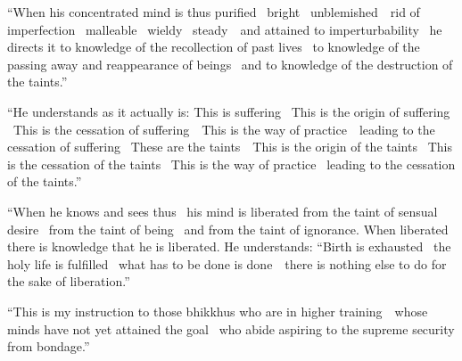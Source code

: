 \ifninebythirteen\clearpage\fi

\begin{english-only-justify}
  ``When his concentrated mind is thus purified \breathmark\ bright \breathmark\ \mbox{unblemished}~\breathmark\ rid of imperfection \breathmark\ malleable \breathmark\ wieldy \breathmark\ \mbox{steady}~\breathmark\ and attained to imperturbability \breathmark\ he directs it to knowledge of the recollection of past lives \breathmark\ to knowledge of the passing away and reappearance of beings \breathmark\ and to knowledge of the destruction of the taints.''
\end{english-only-justify}

\begin{english-only-justify}
  ``He understands as it actually is: This is suffering \breathmark\ This is the origin of suffering \breathmark\ This is the cessation of \mbox{suffering}~\breathmark\ This is the way of \mbox{practice}~\breathmark\ leading to the cessation of suffering \breathmark\ These are the \mbox{taints}~\breathmark\ This is the origin of the taints \breathmark\ This is the cessation of the taints \breathmark\ This is the way of practice \breathmark\ leading to the cessation of the taints.''
\end{english-only-justify}

\begin{english-only-justify}
  ``When he knows and sees thus \breathmark\ his mind is liberated from the taint of sensual desire \breathmark\ from the taint of being \breathmark\ and from the taint of ignorance. When liberated there is knowledge that he is liberated. He understands: ``Birth is exhausted \breathmark\ the holy life is fulfilled \breathmark\ what has to be done is \mbox{done}~\breathmark\ there is nothing else to do for the sake of liberation.''
\end{english-only-justify}

\suttaRef{[MN 39]}

\begin{english-only-justify}
  ``This is my instruction to those bhikkhus who are in higher \mbox{training}~\breathmark\ whose minds have not yet attained the goal \breathmark\ who abide aspiring to the supreme security from bondage.''
\end{english-only-justify}

\suttaRef{[MN 107]}

\ifdigital{}\fi



